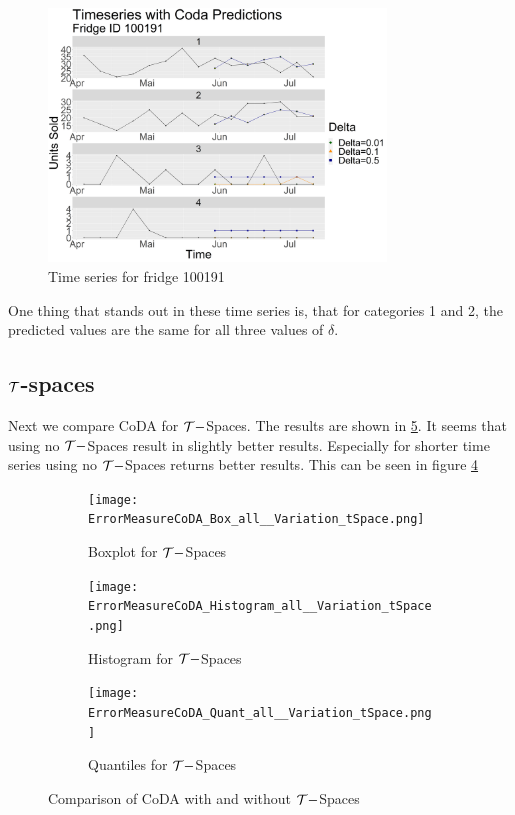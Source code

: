 \begin{figure}[htbp]
	\centering
		\includegraphics[width=0.80\textwidth]{Graphiken/Coda_Timeseries_VariationdL100191.png}
	\caption{Time series for fridge 100191}
	\label{fig:Coda_Timeseries_ID100191}
\end{figure}

One thing that stands out in these time series is, that for categories 1 and 2, the predicted values are the same for all three values of $\delta$. 

\subsection{$\mathcal{T}$-spaces}
\label{sec: Tspaces results}

Next we compare CoDA for $\mathcal{T}-$Spaces. The results are shown in \ref{fig:Coda T-Spaces Comp1}. It seems that using no $\mathcal{T}-$Spaces result in slightly better results. Especially for shorter time series using no $\mathcal{T}-$Spaces returns better results. This can be seen in figure \ref{fig:Coda T-Spaces Quant}

\begin{figure}[htb!]
\centering
\begin{subfigure}[b]{0.45\textwidth}
\texttt{[image: ErrorMeasureCoDA\_Box\_all\_\_Variation\_tSpace.png]}
\caption{Boxplot for $\mathcal{T}-$Spaces}
\label{fig:Coda T-Spaces Box}
\end{subfigure}
\hfill
\begin{subfigure}[b]{0.45\textwidth}
\texttt{[image: ErrorMeasureCoDA\_Histogram\_all\_\_Variation\_tSpace.png]}
\caption{Histogram for $\mathcal{T}-$Spaces}
\label{fig:Coda T-Spaces Hist}
\end{subfigure}
\hfill
\begin{subfigure}[b]{0.8\textwidth}
\texttt{[image: ErrorMeasureCoDA\_Quant\_all\_\_Variation\_tSpace.png]}
\caption{Quantiles for $\mathcal{T}-$Spaces}
\label{fig:Coda T-Spaces Quant}
\end{subfigure}
\caption{Comparison of CoDA with and without $\mathcal{T}-$Spaces}
\label{fig:Coda T-Spaces Comp1}
\end{figure}

